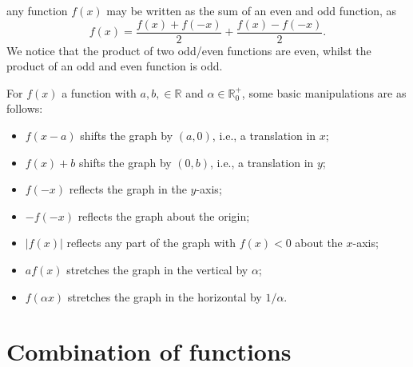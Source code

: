\documentclass[letter-paper]{tufte-book}
\begin{document}
any function $f(x)$ may be written as the sum of an even and odd function, as
\begin{equation*}
  f(x)=\frac{f(x)+f(-x)}{2}+\frac{f(x)-f(-x)}{2}.
\end{equation*}
We notice that the product of two odd/even functions are even, whilst the
product of an odd and even function is odd.

For $f(x)$ a function with $a,b,\in\mathbb{R}$ and $\alpha\in\mathbb{R}_0^+$, 
some basic manipulations are as follows:
\begin{itemize}
  \item $f(x-a)$ shifts the graph by $(a,0)$, i.e., a translation in $x$;
  \item $f(x)+b$ shifts the graph by $(0,b)$, i.e., a translation in $y$;
  \item $f(-x)$ reflects the graph in the $y$-axis;
  \item $-f(-x)$ reflects the graph about the origin;
  \item $|f(x)|$ reflects any part of the graph with $f(x)<0$ about the 
  $x$-axis;
  \item $af(x)$ stretches the graph in the vertical by $\alpha$;
  \item $f(\alpha x)$ stretches the graph in the horizontal by $1/\alpha$.
\end{itemize}


\section{Combination of functions}
\end{document}
